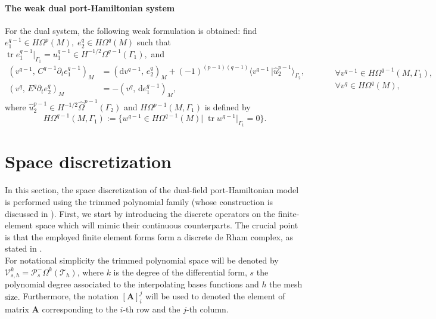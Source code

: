 \documentclass{elsarticle}
\newcommand{\revTwo}[1]{{\color{black}#1}}
\renewcommand\d{\ensuremath{\mathrm{d}}}
\DeclareMathOperator{\tr}{tr}
\newcommand*{\dual}[1]{\ensuremath{\widehat{#1}}}
\newcommand{\inpr}[3][]{\ensuremath{( #2, \, #3 )_{#1}}}
\newcommand{\dualpr}[3][]{\ensuremath{\langle #2 \, \vert #3 \rangle_{#1}}}
\begin{document}
{\paragraph{The weak dual port-Hamiltonian system}
For the dual system, the following weak formulation is obtained: find ${e}^{q-1}_1 \in H{\Omega}^{p}(M), \; {e}^{q}_2 \in H\Omega^{q}(M)$ such that $\tr e^{q-1}_1 \vert_{\Gamma_1} = u_1^{q-1} \in H^{-1/2}\Omega^{q-1}(\Gamma_1), $ and
 \begin{equation}\label{eq:weak_dualPH}
    \begin{aligned}
    \inpr[M]{{v}^{q-1}}{{C}^{q-1} \partial_t {e}^{q-1}_1} &= \inpr[M]{\d {v}^{q-1}}{ {e}^{q}_2} +(-1)^{(p-1)(q-1)}\dualpr[\Gamma_2]{v^{q-1}}{\dual{u}_2^{p-1}}, \\
     \inpr[M]{{v}^{q}}{{E}^{q} \partial_t {e}^{q}_2} &= -\inpr[M]{{v}^{q}}{\d{e}^{q-1}_1},
    \end{aligned}  \qquad 
    \begin{aligned}
    &\forall {v}^{q-1} \in H{\Omega}^{q-1}(M, \Gamma_1), \\
    &\forall {v}^{q} \in H{\Omega}^{q}(M), \\
    \end{aligned}
 \end{equation}
where $\dual{u}^{p-1}_2 \in H^{-1/2}\dual{\Omega}^{p-1}(\Gamma_2)$ and $H{\Omega}^{p-1}(M, \Gamma_1)$  is defined by
\begin{equation}
        H{\Omega}^{q-1}(M, \Gamma_1) := \{{w}^{q-1} \in H{\Omega}^{q-1}(M) \vert \; \tr {w}^{q-1}\vert_{\Gamma_1} = 0 \}. 
\end{equation}
}


\section{Space discretization}\label{sec:space_discr}

In this section, the space discretization of the dual-field port-Hamiltonian model is performed using the trimmed polynomial family (whose construction is discussed in \revTwo{\cite{arnold2006acta,arnold2018finite}}).
First, we start by introducing the discrete operators on the finite-element space which will mimic their continuous counterparts.
The crucial point is that the employed finite element forms form a discrete de Rham complex, as stated in \cite[Lemma 3.8]{arnold2006acta}. \\

For notational simplicity the trimmed polynomial space will be denoted by $\mathcal{V}_{s, h}^k = \mathcal{P}^-_s\Omega^k(\mathcal{T}_h)$, where $k$ is the degree of the differential form, $s$ the polynomial degree associated to the interpolating bases functions and $h$ the mesh size.
\revTwo{Furthermore, the notation $[\mathbf{A}]_i^j$ will be used to denoted the element of matrix $\mathbf{A}$ corresponding to the $i$-th row and the $j$-th column.}
\end{document}
